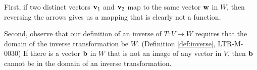 \documentclass{ximera}
\renewcommand{\vec}[1]{{\bf #1}}
\begin{document}
 First, if two distinct vectors $\vec{v}_1$ and $\vec{v}_2$ map to the same vector $\vec{w}$ in $W$, then reversing the arrows gives us a mapping that is clearly not a function. %
 

\begin{center}
\end{center}
  

Second, observe that our definition of an inverse of $T:V\rightarrow W$ requires that the domain of the inverse transformation be $W$. (Definition \ref{def:inverse}, LTR-M-0030)  If there is a vector $\vec{b}$ in $W$ that is not an image of any vector in $V$, then $\vec{b}$ cannot be in the domain of an inverse transformation. %

\begin{center}
\quad\quad
{}\quad
  \label{fig:notonto} 
\end{center}
\end{document}
